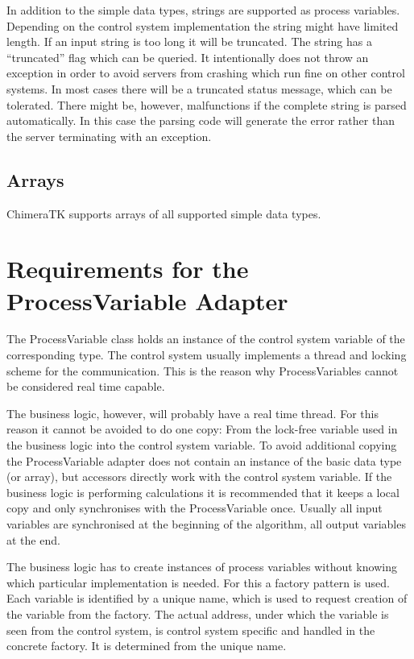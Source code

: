 \documentclass[11pt,a4paper]{scrartcl}
\begin{document}
In addition to the simple data types, strings are supported as process variables.
Depending on the control system implementation the string might have limited
length. If an input string is too long it will be truncated. The string has a
“truncated” flag which can be queried. It intentionally does not throw an
exception in order to avoid servers from crashing which run fine on other
control systems. In most cases there will be a truncated status message, which
can be tolerated. There might be, however, malfunctions if the complete string
is parsed automatically. In this case the parsing code will generate the error
rather than the server terminating with an exception. 

\subsection{Arrays}

ChimeraTK supports arrays of all supported simple data types.

\section{Requirements for the ProcessVariable Adapter}\label{section_process_variable_adapter}

The ProcessVariable class holds an instance of the control system variable of
the corresponding type. The control system usually implements a thread and
locking scheme for the communication. This is the reason why ProcessVariables
cannot be considered real time capable. 

The business logic, however, will probably have a real time thread. For this
reason it cannot be avoided to do one copy: From the lock-free variable used
in the business logic into the control system variable. To avoid additional
copying the ProcessVariable adapter does not contain an instance of the basic
data type (or array), but accessors directly work with the control system
variable. 
If the business logic is performing calculations it is recommended that 
it keeps a local copy and only synchronises with the ProcessVariable once.
Usually all input variables are synchronised at the beginning of the 
algorithm, all output variables at the end.

The business logic has to create instances of process variables without
knowing which particular implementation is needed. For this a factory pattern
is used. Each variable is identified by a unique name, which is used to
request creation of the variable from the factory. The actual address, under
which the variable is seen from the control system, is control system specific
and handled in the concrete factory. It is determined from the unique name. 
\end{document}
